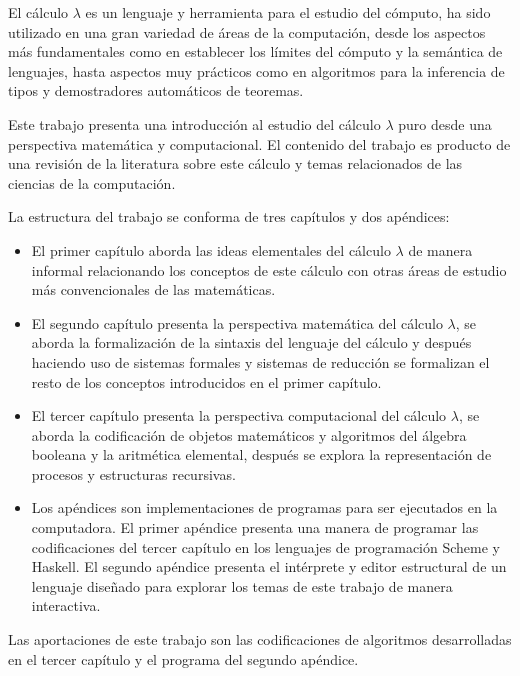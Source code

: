 El cálculo \( λ \) es un lenguaje y herramienta para el estudio del cómputo, ha sido utilizado en una gran variedad de áreas de la computación, desde los aspectos más fundamentales como en establecer los límites del cómputo y la semántica de lenguajes, hasta aspectos muy prácticos como en algoritmos para la inferencia de tipos y demostradores automáticos de teoremas.

Este trabajo presenta una introducción al estudio del cálculo \( λ \) puro desde una perspectiva matemática y computacional. El contenido del trabajo es producto de una revisión de la literatura sobre este cálculo y temas relacionados de las ciencias de la computación.

La estructura del trabajo se conforma de tres capítulos y dos apéndices:

\begin{itemize}
\item El primer capítulo aborda las ideas elementales del cálculo \( λ \) de manera informal relacionando los conceptos de este cálculo con otras áreas de estudio más convencionales de las matemáticas.

\item El segundo capítulo presenta la perspectiva matemática del cálculo \( λ \), se aborda la formalización de la sintaxis del lenguaje del cálculo y después haciendo uso de sistemas formales y sistemas de reducción se formalizan el resto de los conceptos introducidos en el primer capítulo.

\item El tercer capítulo presenta la perspectiva computacional del cálculo \( λ \), se aborda la codificación de objetos matemáticos y algoritmos del álgebra booleana y la aritmética elemental, después se explora la representación de procesos y estructuras recursivas.

\item Los apéndices son implementaciones de programas para ser ejecutados en la computadora. El primer apéndice presenta una manera de programar las codificaciones del tercer capítulo en los lenguajes de programación Scheme y Haskell. El segundo apéndice presenta el intérprete y editor estructural de un lenguaje diseñado para explorar los temas de este trabajo de manera interactiva.
\end{itemize}

Las aportaciones de este trabajo son las codificaciones de algoritmos desarrolladas en el tercer capítulo y el programa del segundo apéndice.